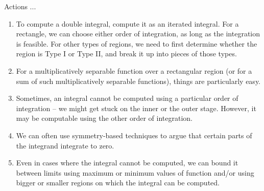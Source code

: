 \documentclass[10pt]{amsart}
\begin{document}
Actions ...

\begin{enumerate}
\item To compute a double integral, compute it as an iterated
  integral. For a rectangle, we can choose either order of
  integration, as long as the integration is feasible. For other types
  of regions, we need to first determine whether the region is Type I
  or Type II, and break it up into pieces of those types.
\item For a multiplicatively separable function over a rectangular
  region (or for a sum of such multiplicatively separable functions),
  things are particularly easy.
\item Sometimes, an integral cannot be computed using a particular
  order of integration -- we might get stuck on the inner or the outer
  stage. However, it may be computable using the other order of
  integration.
\item We can often use symmetry-based techniques to argue that certain
  parts of the integrand integrate to zero.
\item Even in cases where the integral cannot be computed, we can
  bound it between limits using maximum or minimum values of function
  and/or using bigger or smaller regions on which the integral can be
  computed.
\end{enumerate}
\end{document}
